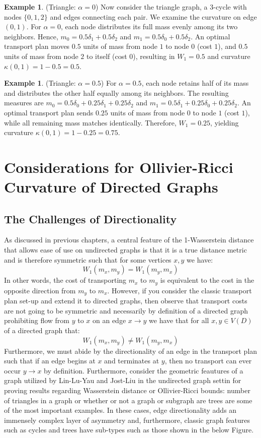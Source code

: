 \documentclass{Dissertate}
\theoremstyle{definition}
\theoremstyle{definition} %
\theoremstyle{definition}
\newtheorem{example}[theorem]{Example}
\begin{document}
\begin{example}(Triangle: $\alpha = 0$)
Now consider the triangle graph, a 3-cycle with nodes $\{0,1,2\}$ and edges connecting each pair. We examine the curvature on edge $(0,1)$. For $\alpha = 0$, each node distributes its full mass evenly among its two neighbors. Hence, $m_0 = 0.5\delta_1 + 0.5\delta_2$ and $m_1 = 0.5\delta_0 + 0.5\delta_2$. An optimal transport plan moves $0.5$ units of mass from node $1$ to node $0$ (cost $1$), and $0.5$ units of mass from node $2$ to itself (cost $0$), resulting in $W_1 = 0.5$ and curvature $\kappa(0,1) = 1 - 0.5 = 0.5$.
\end{example}
\begin{example}  \label{example2}
(Triangle: $\alpha = 0.5$)
For $\alpha = 0.5$, each node retains half of its mass and distributes the other half equally among its neighbors. The resulting measures are $m_0 = 0.5\delta_0 + 0.25\delta_1 + 0.25\delta_2$ and $m_1 = 0.5\delta_1 + 0.25\delta_0 + 0.25\delta_2$. An optimal transport plan sends $0.25$ units of mass from node $0$ to node $1$ (cost $1$), while all remaining mass matches identically. Therefore, $W_1 = 0.25$, yielding curvature $\kappa(0,1) = 1 - 0.25 = 0.75$.
\end{example}

\chapter{Considerations for Ollivier-Ricci Curvature of Directed Graphs}


\section*{The Challenges of Directionality}

As discussed in previous chapters, a central feature of the 1-Wasserstein distance that allows ease of use on undirected graphs is that it is a true distance metric and is therefore symmetric such that for some vertices $x,y$ we have:
$$
W_1(m_x,m_y) = W_1(m_y,m_x)
$$
In other words, the cost of transporting $m_x$ to $m_y$ is equivalent to the cost in the opposite direction from $m_y$ to $m_x$. However, if you consider the classic transport plan set-up and extend it to directed graphs, then observe that transport costs are not going to be symmetric and necessarily by definition of a directed graph prohibiting flow from $y$ to $x$ on an edge $x \rightarrow y$ we have that for all $x,y \in V(D)$ of a directed graph that:
$$
W_1(m_x,m_y) \neq W_1(m_y,m_x)
$$
Furthermore, we must abide by the directionality of an edge in the transport plan such that if an edge begins at $x$ and terminates at $y$, then no transport can ever occur $y \rightarrow x$ by definition. Furthermore, consider the geometric feautures of a graph utilized by Lin-Lu-Yau and Jost-Liu in the undirected graph settin for proving results regarding Wasserstein distance or Ollivier-Ricci bounds: number of triangles in a graph or whether or not a graph or subgraph are trees are some of the most important examples. In these cases, edge directionality adds an immensely complex layer of asymmetry and, furthermore, classic graph features such as cycles and trees have sub-types such as those shown in the below Figure.
\end{document}
